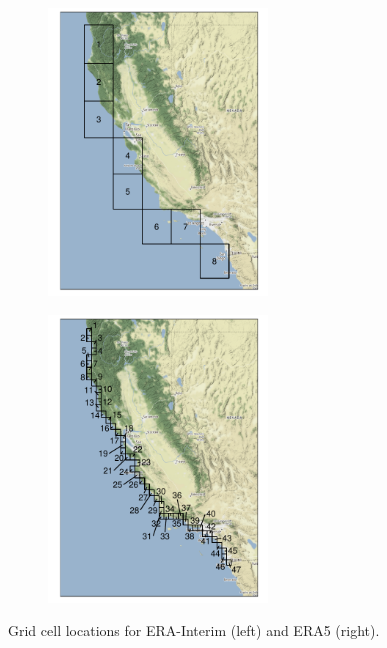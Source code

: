 \begin{figure}[ht]
    \begin{center}
    \begin{subfigure}[b]{0.48\textwidth}
        \centering 
        \includegraphics[height=3in]{./images/erai_grid}
    \end{subfigure}
    \begin{subfigure}[b]{0.48\textwidth}
        \centering
        \includegraphics[height=3in]{./images/era5_grid}
    \end{subfigure}
    \caption{Grid cell locations for ERA-Interim (left) and ERA5 (right).\label{fig:gridlocs}}
    \end{center}
\end{figure}

